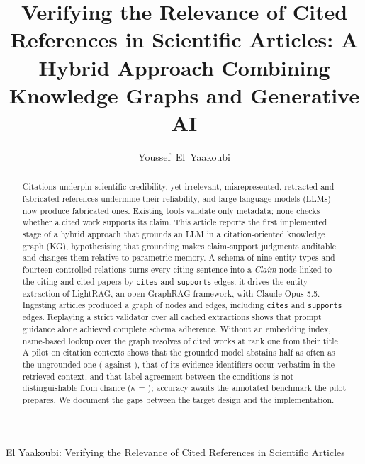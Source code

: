 \documentclass[lettersize,journal]{IEEEtran}
\begin{document}
\title{Verifying the Relevance of Cited References in Scientific Articles: A Hybrid Approach Combining Knowledge Graphs and Generative AI}

\author{Youssef~El~Yaakoubi}

\markboth{}%
{El Yaakoubi: Verifying the Relevance of Cited References in Scientific Articles}

\maketitle

\begin{abstract}
Citations underpin scientific credibility, yet irrelevant, misrepresented, retracted and fabricated references undermine their reliability, and large language models (LLMs) now produce fabricated ones. Existing tools validate only metadata; none checks whether a cited work supports its claim. This article reports the first implemented stage of a hybrid approach that grounds an LLM in a citation-oriented knowledge graph (KG), hypothesising that grounding makes claim-support judgments auditable and changes them relative to parametric memory. A schema of nine entity types and fourteen controlled relations turns every citing sentence into a \emph{Claim} node linked to the citing and cited papers by \texttt{cites} and \texttt{supports} edges; it drives the entity extraction of LightRAG, an open GraphRAG framework, with Claude Opus 5.5. Ingesting \nDocsProcessed{} articles produced a graph of \nNodes{} nodes and \nEdges{} edges, including \nCites{} \texttt{cites} and \nSupports{} \texttt{supports} edges. Replaying a strict validator over all cached extractions shows that prompt guidance alone achieved complete schema adherence. Without an embedding index, name-based lookup over the graph resolves  of cited works at rank one from their title. A pilot on \pilotN{} citation contexts shows that the grounded model abstains half as often as the ungrounded one (\pilotAInsufficientEvidencePct{} against \pilotBInsufficientEvidencePct{}), that \pilotIdsGroundedPct{} of its evidence identifiers occur verbatim in the retrieved context, and that label agreement between the conditions is not distinguishable from chance ($\kappa$ = \pilotKappa); accuracy awaits the annotated benchmark the pilot prepares. We document the gaps between the target design and the implementation.
\end{abstract}
\end{document}
